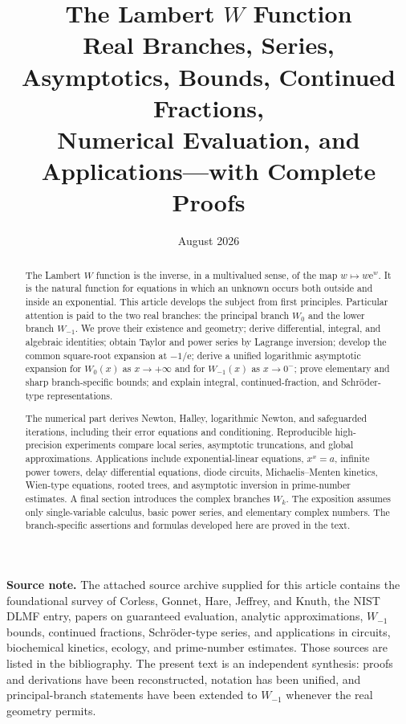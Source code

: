\documentclass[11pt]{article}
\title{\textbf{The Lambert $W$ Function}\\[0.5ex]
\large Real Branches, Series, Asymptotics, Bounds, Continued Fractions,\\
Numerical Evaluation, and Applications---with Complete Proofs}
\author{}
\date{August 2026}
\numberwithin{equation}{section}
\theoremstyle{definition}
\theoremstyle{remark}
\newcommand{\e}{\mathrm e}
\begin{document}
\maketitle

\begin{abstract}
The Lambert $W$ function is the inverse, in a multivalued sense, of the map
$w\mapsto w\e^w$.  It is the natural function for equations in which an
unknown occurs both outside and inside an exponential.  This article develops
the subject from first principles.  Particular attention is paid to the two
real branches: the principal branch $W_0$ and the lower branch $W_{-1}$.  We
prove their existence and geometry; derive differential, integral, and
algebraic identities; obtain Taylor and power series by Lagrange inversion;
develop the common square-root expansion at $-1/\e$; derive a unified
logarithmic asymptotic expansion for $W_0(x)$ as $x\to+\infty$ and for
$W_{-1}(x)$ as $x\to0^-$; prove elementary and sharp branch-specific bounds;
and explain integral, continued-fraction, and Schröder-type representations.

The numerical part derives Newton, Halley, logarithmic Newton, and safeguarded
iterations, including their error equations and conditioning.  Reproducible
high-precision experiments compare local series, asymptotic truncations, and
global approximations.  Applications include exponential-linear equations,
$x^x=a$, infinite power towers, delay differential equations, diode circuits,
Michaelis--Menten kinetics, Wien-type equations, rooted trees, and asymptotic
inversion in prime-number estimates.  A final section introduces the complex
branches $W_k$.  The exposition assumes only single-variable calculus, basic
power series, and elementary complex numbers.  The branch-specific assertions and
formulas developed here are proved in the text.
\end{abstract}

\vspace{1ex}
\noindent\textbf{Source note.}
The attached source archive supplied for this article contains the foundational
survey of Corless, Gonnet, Hare, Jeffrey, and Knuth, the NIST DLMF entry,
papers on guaranteed evaluation, analytic approximations, $W_{-1}$ bounds,
continued fractions, Schröder-type series, and applications in circuits,
biochemical kinetics, ecology, and prime-number estimates.  Those sources are
listed in the bibliography.  The present text is an independent synthesis:
proofs and derivations have been reconstructed, notation has been unified, and
principal-branch statements have been extended to $W_{-1}$ whenever the real
geometry permits.
\end{document}
